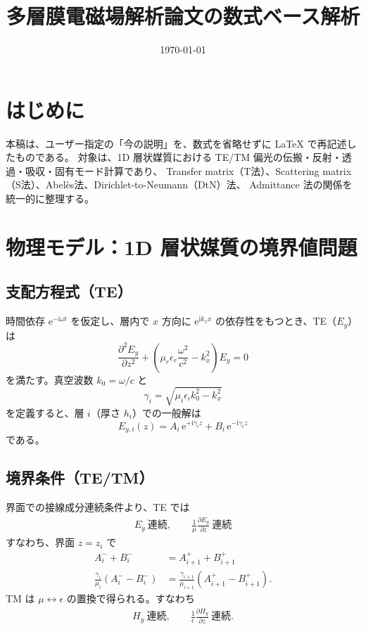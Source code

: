 \documentclass[a4paper,11pt]{article}
\title{多層膜電磁場解析論文の数式ベース解析}
\author{}
\date{\today}
\newcommand{\ii}{\mathrm{i}}
\newcommand{\ee}{\mathrm{e}}
\begin{document}
\maketitle

\section*{はじめに}
本稿は、ユーザー指定の「今の説明」を、数式を省略せずに \LaTeX{} で再記述したものである。
対象は、1D 層状媒質における TE/TM 偏光の伝搬・反射・透過・吸収・固有モード計算であり、
Transfer matrix（T法）、Scattering matrix（S法）、Abel\`es法、Dirichlet-to-Neumann（DtN）法、
Admittance 法の関係を統一的に整理する。

\section{物理モデル：1D 層状媒質の境界値問題}

\subsection{支配方程式（TE）}
時間依存 $\ee^{-\ii\omega t}$ を仮定し、層内で $x$ 方向に $\ee^{\ii k_x x}$ の依存性をもつとき、TE（$E_y$）は
\begin{equation}
\frac{\partial^2 E_y}{\partial z^2}
+\left(\mu_r\epsilon_r\frac{\omega^2}{c^2}-k_x^2\right)E_y=0
\end{equation}
を満たす。真空波数 $k_0=\omega/c$ と
\begin{equation}
\gamma_i=\sqrt{\mu_i\epsilon_i k_0^2-k_x^2}
\end{equation}
を定義すると、層 $i$（厚さ $h_i$）での一般解は
\begin{equation}
E_{y,i}(z)=A_i\,\ee^{+\ii\gamma_i z}+B_i\,\ee^{-\ii\gamma_i z}
\end{equation}
である。

\subsection{境界条件（TE/TM）}
界面での接線成分連続条件より、TE では
\begin{align}
E_y \ \text{連続}, \qquad \frac{1}{\mu}\frac{\partial E_y}{\partial z}\ \text{連続}
\end{align}
すなわち、界面 $z=z_i$ で
\begin{align}
A_i^-+B_i^- &= A_{i+1}^+ + B_{i+1}^+ \\
\frac{\gamma_i}{\mu_i}(A_i^- - B_i^-) &=
\frac{\gamma_{i+1}}{\mu_{i+1}}(A_{i+1}^+ - B_{i+1}^+).
\end{align}
TM は $\mu\leftrightarrow\epsilon$ の置換で得られる。すなわち
\begin{align}
H_y \ \text{連続}, \qquad \frac{1}{\epsilon}\frac{\partial H_y}{\partial z}\ \text{連続}.
\end{align}
\end{document}
